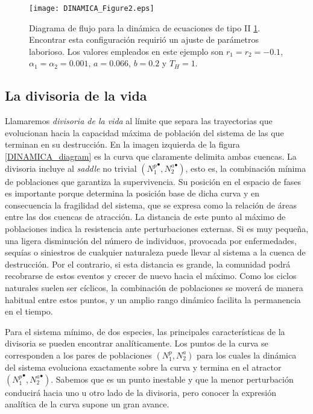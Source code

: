 \begin{figure}
\centering
\texttt{[image: DINAMICA\_Figure2.eps]}
\caption {Diagrama de flujo para la dinámica de ecuaciones de tipo II \ref{DINAMICA_typeII}. Encontrar esta configuración requirió un ajuste de parámetros laborioso. Los valores empleados en este ejemplo son $r_1 = r_2 = -0.1$, $\alpha_1 = \alpha_2 = 0.001$, $a = 0.066$, $b = 0.2$ y $T_H = 1$.}
\label{DINAMICA_typeII}
\end{figure}

\subsection{La divisoria de la vida}
\label{watershed}

Llamaremos \textit{divisoria de la vida} al límite que separa las trayectorias que evolucionan hacia la capacidad máxima de población del sistema de las que terminan en su destrucción. En la imagen izquierda de la figura \ref{DINAMICA_diagram} es la curva que claramente delimita ambas cuencas. La divisoria incluye al \textit{saddle} no trivial $({N_1^p}^\bullet,{N_2^a}^\bullet)$, esto es, la combinación mínima de poblaciones que garantiza la supervivencia. Su posición en el espacio de fases es importante porque determina la posición base de dicha curva y en consecuencia la fragilidad del sistema, que se expresa como la relación de áreas entre las dos cuencas de atracción. La distancia de este punto al máximo de poblaciones indica la resistencia ante perturbaciones externas. Si es muy pequeña, una ligera disminución del número de individuos, provocada por enfermedades, sequías o siniestros de cualquier naturaleza puede llevar al sistema a la cuenca de destrucción. Por el contrario, si esta distancia es grande, la comunidad podrá recobrarse de estos eventos y crecer de nuevo hacia el máximo. Como los ciclos naturales suelen ser cíclicos, la combinación de poblaciones se moverá de manera habitual entre estos puntos, y un amplio rango dinámico facilita la permanencia en el tiempo. 

Para el sistema mínimo, de dos especies, las principales características de la divisoria se pueden encontrar analíticamente. Los puntos de la curva se corresponden a los pares de poblaciones $({N_1^p},{N_2^a})$ para los cuales la dinámica del sistema evoluciona exactamente sobre la curva y termina en el atractor $({N_1^p}^\bullet,{N_2^a}^\bullet)$. Sabemos que es un punto inestable y que la menor perturbación conducirá hacia uno u otro lado de la divisoria, pero conocer la expresión analítica de la curva supone un gran avance.  


